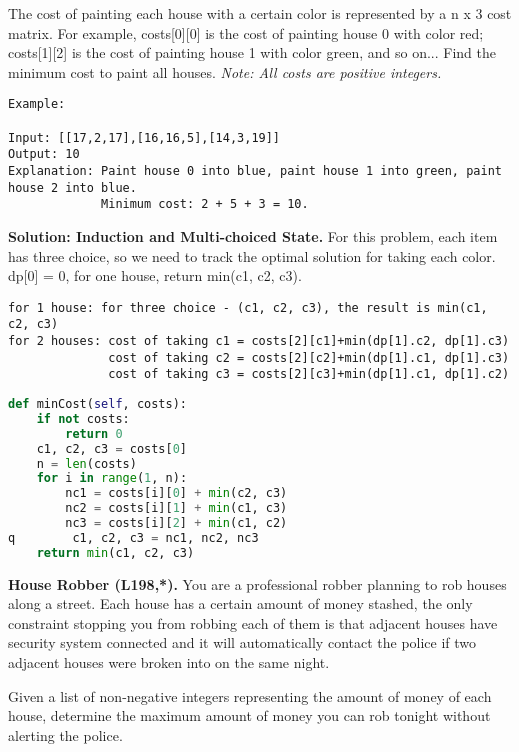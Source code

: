 \documentclass[../main.tex]{subfiles}
\begin{document}
\begin{examples}
The cost of painting each house with a certain color is represented by a n x 3 cost matrix. For example, costs[0][0] is the cost of painting house 0 with color red; costs[1][2] is the cost of painting house 1 with color green, and so on... Find the minimum cost to paint all houses. \textit{Note: All costs are positive integers.}
\begin{lstlisting}[numbers=none]
Example:

Input: [[17,2,17],[16,16,5],[14,3,19]]
Output: 10
Explanation: Paint house 0 into blue, paint house 1 into green, paint house 2 into blue. 
             Minimum cost: 2 + 5 + 3 = 10.

\end{lstlisting}
\textbf{Solution: Induction and Multi-choiced State.} For this problem, each item has three choice, so we need to track the optimal solution for taking each color. dp[0] = 0, for one house, return min(c1, c2, c3). 
\begin{lstlisting}[numbers=none]
for 1 house: for three choice - (c1, c2, c3), the result is min(c1, c2, c3)
for 2 houses: cost of taking c1 = costs[2][c1]+min(dp[1].c2, dp[1].c3)
              cost of taking c2 = costs[2][c2]+min(dp[1].c1, dp[1].c3)
              cost of taking c3 = costs[2][c3]+min(dp[1].c1, dp[1].c2)
\end{lstlisting}
\begin{lstlisting}[language=Python]
def minCost(self, costs):
    if not costs:
        return 0
    c1, c2, c3 = costs[0]
    n = len(costs)
    for i in range(1, n):
        nc1 = costs[i][0] + min(c2, c3)
        nc2 = costs[i][1] + min(c1, c3)
        nc3 = costs[i][2] + min(c1, c2)
q        c1, c2, c3 = nc1, nc2, nc3
    return min(c1, c2, c3)
\end{lstlisting}
\item \textbf{House Robber (L198,*).} You are a professional robber planning to rob houses along a street. Each house has a certain amount of money stashed, the only constraint stopping you from robbing each of them is that adjacent houses have security system connected and it will automatically contact the police if two adjacent houses were broken into on the same night.

Given a list of non-negative integers representing the amount of money of each house, determine the maximum amount of money you can rob tonight without alerting the police.


\end{examples}
\end{document}
